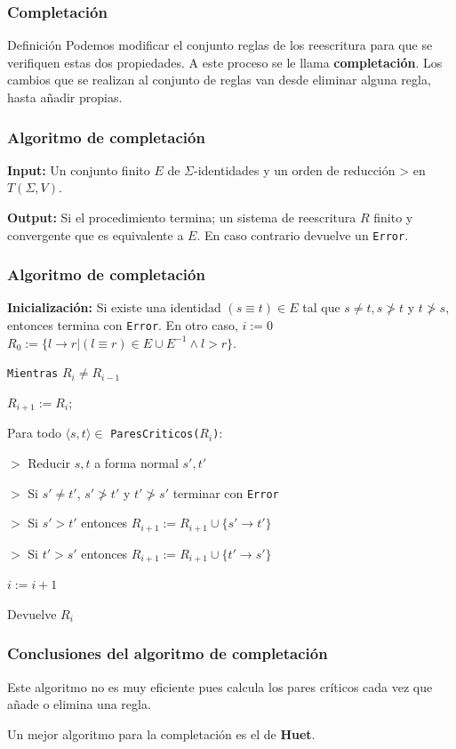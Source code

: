 \documentclass{beamer}
\begin{document}
\begin{frame}
  \frametitle{Completación}

  \begin{block}{Definición}
    Podemos modificar el conjunto reglas de los reescritura para que
    se verifiquen estas dos propiedades. A este proceso se le llama
    \textbf{completación}. Los cambios que se realizan al conjunto de
    reglas van desde eliminar alguna regla, hasta añadir propias.
  \end{block}
  
\end{frame}

\begin{frame}
  \frametitle{Algoritmo de completación}

  \textbf{Input:} Un conjunto finito $E$ de $\Sigma$-identidades y un
  orden de reducción > en $T(\Sigma, V)$.

  \textbf{Output:} Si el procedimiento termina; un sistema de
  reescritura $R$ finito y convergente que es equivalente a $E$. En
  caso contrario devuelve un \texttt{Error}.

\end{frame}

\begin{frame}
  \frametitle{Algoritmo de completación}

\textbf{Inicialización:}
Si existe una identidad $(s \equiv t) \in E$ tal que
$s \not = t, s \not > t$ y $t \not > s$, entonces termina con
\texttt{Error}.
En otro caso,
$i := 0$
$R_0 := \{l \rightarrow r | (l \equiv r) \in E \cup E^{-1} \wedge l > r \}$.

\texttt{Mientras} $R_i \not = R_{i-1}$

$R_{i+1} := R_i$;

Para todo $\langle s, t \rangle \in$ \texttt{ParesCriticos($R_i$)}:

$>$ Reducir $s,t$ a forma normal $s', t'$

$>$ Si $s' \not = t'$, $s' \not > t'$ y $t' \not > s'$ terminar con \texttt{Error}

$>$ Si $s' > t'$ entonces $R_{i+1} := R_{i+1} \cup \{s' \rightarrow t'\}$

$>$ Si $t' > s'$ entonces $R_{i+1} := R_{i+1} \cup \{t' \rightarrow s'\}$

$i := i+1$

Devuelve $R_i$

\end{frame}

\begin{frame}
  \frametitle{Conclusiones del algoritmo de completación}
  \begin{block}{}
    Este algoritmo no es muy eficiente pues calcula los pares críticos
    cada vez que añade o elimina una regla.
  \end{block}

  \begin{block}{}
    Un mejor algoritmo para la completación es el de \textbf{Huet}.
  \end{block}
\end{frame}
\end{document}
